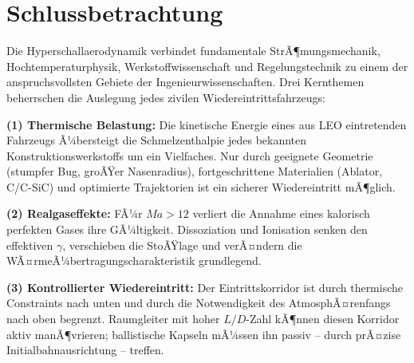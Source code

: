 ﻿\documentclass[12pt,a4paper]{article}
\newcommand{\Ma}{M\!a}
\begin{document}
\section{Schlussbetrachtung}

Die Hyperschallaerodynamik verbindet fundamentale StrÃ¶mungsmechanik,
Hochtemperaturphysik, Werkstoffwissenschaft und Regelungstechnik zu einem
der anspruchsvollsten Gebiete der Ingenieurwissenschaften. Drei Kernthemen
beherrschen die Auslegung jedes zivilen Wiedereintrittsfahrzeugs:

\textbf{(1) Thermische Belastung:} Die kinetische Energie eines aus LEO
eintretenden Fahrzeugs Ã¼bersteigt die Schmelzenthalpie jedes bekannten
Konstruktionswerkstoffs um ein Vielfaches. Nur durch geeignete Geometrie
(stumpfer Bug, groÃŸer Nasenradius), fortgeschrittene Materialien (Ablator,
C/C-SiC) und optimierte Trajektorien ist ein sicherer Wiedereintritt mÃ¶glich.

\textbf{(2) Realgaseffekte:} FÃ¼r $\Ma > 12$ verliert die Annahme eines
kalorisch perfekten Gases ihre GÃ¼ltigkeit. Dissoziation und Ionisation senken
den effektiven $\gamma$, verschieben die StoÃŸlage und verÃ¤ndern die
WÃ¤rmeÃ¼bertragungscharakteristik grundlegend.

\textbf{(3) Kontrollierter Wiedereintritt:} Der Eintrittskorridor ist durch
thermische Constraints nach unten und durch die Notwendigkeit des AtmosphÃ¤renfangs
nach oben begrenzt. Raumgleiter mit hoher $L/D$-Zahl kÃ¶nnen diesen Korridor
aktiv manÃ¶vrieren; ballistische Kapseln mÃ¼ssen ihn passiv -- durch prÃ¤zise
Initialbahnausrichtung -- treffen.

\bigskip
\end{document}
